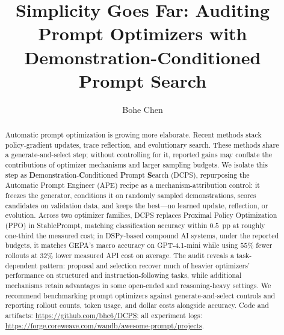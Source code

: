 \documentclass[runningheads]{llncs}
\begin{document}
\title{Simplicity Goes Far: Auditing Prompt Optimizers with Demonstration-Conditioned Prompt Search}

\author{Bohe Chen}

\maketitle

\begin{abstract}
Automatic prompt optimization is growing more elaborate. Recent methods
stack policy-gradient updates, trace reflection, and evolutionary search. These
methods share a generate-and-select step; without controlling for it, reported
gains may conflate the contributions of optimizer mechanisms and larger
sampling budgets. We isolate this step as
\textbf{D}emonstration-\textbf{C}onditioned \textbf{P}rompt \textbf{S}earch
(DCPS), repurposing the Automatic Prompt Engineer (APE) recipe as a
mechanism-attribution control: it freezes the generator, conditions it on
randomly sampled demonstrations, scores candidates on validation data, and
keeps the best---no learned update, reflection, or evolution. Across two
optimizer families, DCPS replaces Proximal Policy Optimization (PPO) in StablePrompt, matching classification
accuracy within $0.5$~pp at roughly one-third the measured cost; in DSPy-based
compound AI systems, under the reported budgets, it matches GEPA's macro
accuracy on GPT-4.1-mini while using $55\%$ fewer rollouts at $32\%$ lower
measured API cost on average. The audit reveals a task-dependent pattern:
proposal and selection recover much of heavier optimizers' performance on
structured and instruction-following tasks, while additional mechanisms retain
advantages in some open-ended and reasoning-heavy settings. We recommend
benchmarking prompt optimizers against generate-and-select controls and
reporting rollout counts, token usage, and dollar costs alongside accuracy. Code and artifacts: \url{https://github.com/bhc6/DCPS}; all experiment logs: \url{https://forge.coreweave.com/wandb/awesome-prompt/projects}.

\end{abstract}
\end{document}

